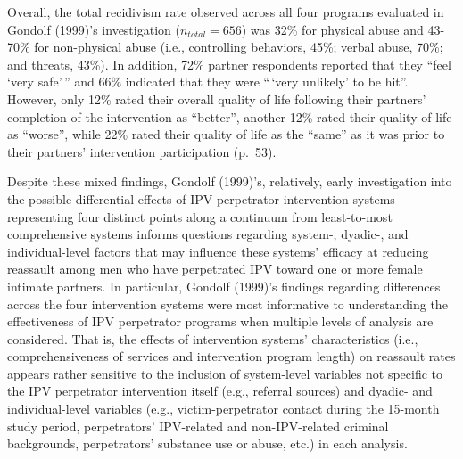 \documentclass[11pt,]{tufte-book}
\begin{document}
Overall, the total recidivism rate observed across all four programs
evaluated in Gondolf (1999)'s investigation (\(n_{total} = 656\)) was
32\% for physical abuse and 43-70\% for non-physical abuse (i.e.,
controlling behaviors, 45\%; verbal abuse, 70\%; and threats, 43\%). In
addition, 72\% partner respondents reported that they ``feel `very
safe'\,'' and 66\% indicated that they were ``\,`very unlikely' to be
hit''. However, only 12\% rated their overall quality of life following
their partners' completion of the intervention as ``better'', another
12\% rated their quality of life as ``worse'', while 22\% rated their
quality of life as the ``same'' as it was prior to their partners'
intervention participation (p.~53).

Despite these mixed findings, Gondolf (1999)'s, relatively, early
investigation into the possible differential effects of IPV perpetrator
intervention systems representing four distinct points along a continuum
from least-to-most comprehensive systems informs questions regarding
system-, dyadic-, and individual-level factors that may influence these
systems' efficacy at reducing reassault among men who have perpetrated
IPV toward one or more female intimate partners. In particular, Gondolf
(1999)'s findings regarding differences across the four intervention
systems were most informative to understanding the effectiveness of IPV
perpetrator programs when multiple levels of analysis are considered.
That is, the effects of intervention systems' characteristics (i.e.,
comprehensiveness of services and intervention program length) on
reassault rates appears rather sensitive to the inclusion of
system-level variables not specific to the IPV perpetrator intervention
itself (e.g., referral sources) and dyadic- and individual-level
variables (e.g., victim-perpetrator contact during the 15-month study
period, perpetrators' IPV-related and non-IPV-related criminal
backgrounds, perpetrators' substance use or abuse, etc.) in each
analysis.
\end{document}
